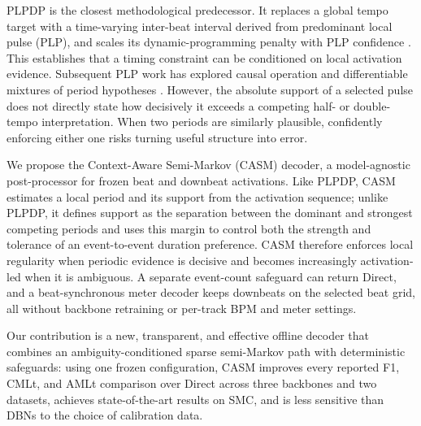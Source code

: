 \documentclass{article}
\begin{document}
PLPDP is the closest methodological predecessor. It replaces a global tempo
target with a time-varying inter-beat interval derived from predominant local
pulse (PLP), and scales its dynamic-programming penalty with PLP confidence
\cite{chiu2023localperiodicity}. This establishes that a timing constraint can
be conditioned on local activation evidence. Subsequent PLP work has explored
causal operation and differentiable mixtures of period hypotheses
\cite{meier2024realtime,chiu2025dplp}. However, the absolute support of a
selected pulse does not directly state how decisively it exceeds a competing
half- or double-tempo interpretation. When two periods are similarly plausible,
confidently enforcing either one risks turning useful structure into error.

We propose the Context-Aware Semi-Markov (CASM) decoder, a model-agnostic
post-processor for frozen beat and downbeat activations. Like PLPDP, CASM
estimates a local period and its support from the activation sequence; unlike
PLPDP, it defines support as the separation between the dominant and strongest
competing periods and uses this margin to control both the strength and
tolerance of an event-to-event duration preference. CASM therefore enforces
local regularity when periodic evidence is decisive and becomes increasingly
activation-led when it is ambiguous. A separate event-count safeguard can
return Direct, and a beat-synchronous meter decoder keeps downbeats on the
selected beat grid, all without backbone retraining or per-track BPM and meter
settings.

Our contribution is a new, transparent, and effective offline decoder that
combines an ambiguity-conditioned sparse semi-Markov path with deterministic
safeguards: using one frozen configuration, CASM improves every reported F1,
CMLt, and AMLt comparison over Direct across three backbones and two datasets,
achieves state-of-the-art results on SMC, and is less sensitive than DBNs to the
choice of calibration data.

\newpage
\end{document}

